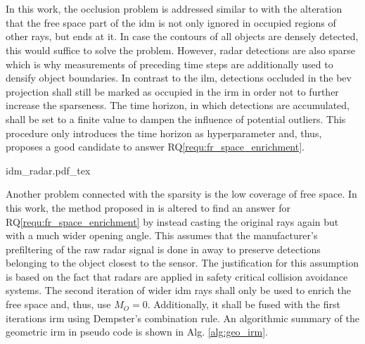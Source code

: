 \\\\
In this work, the occlusion problem is addressed similar to \cite{werber2015automotive} with the alteration that the free space part of the \gls{idm} is not only ignored in occupied regions of other rays, but ends at it. In case the contours of all objects are densely detected, this would suffice to solve the problem. However, radar detections are also sparse which is why measurements of preceding time steps are additionally used to densify object boundaries. In contrast to the \gls{ilm}, detections occluded in the \gls{bev} projection shall still be marked as occupied in the \gls{irm} in order not to further increase the sparseness. The time horizon, in which detections are accumulated, shall be set to a finite value to dampen the influence of potential outliers. This procedure only introduces the time horizon as hyperparameter and, thus, proposes a good candidate to answer RQ\ref{requ:fr_space_enrichment}.
\begin{center}
	{idm_radar.pdf_tex}
\end{center}
Another problem connected with the sparsity is the low coverage of free space. In this work, the method proposed in \cite{prophet2018adaptions} is altered to find an answer for RQ\ref{requ:fr_space_enrichment} by instead casting the original rays again but with a much wider opening angle. This assumes that the manufacturer's prefiltering of the raw radar signal is done in away to preserve detections belonging to the object closest to the sensor. The justification for this assumption is based on the fact that radars are applied in safety critical collision avoidance systems. The second iteration of wider \gls{idm} rays shall only be used to enrich the free space and, thus, use $M_O = 0$. Additionally, it shall be fused with the first iterations \gls{irm} using Dempster's combination rule. An algorithmic summary of the geometric \gls{irm} in pseudo code is shown in Alg. \ref{alg:geo_irm}.
\\\\
